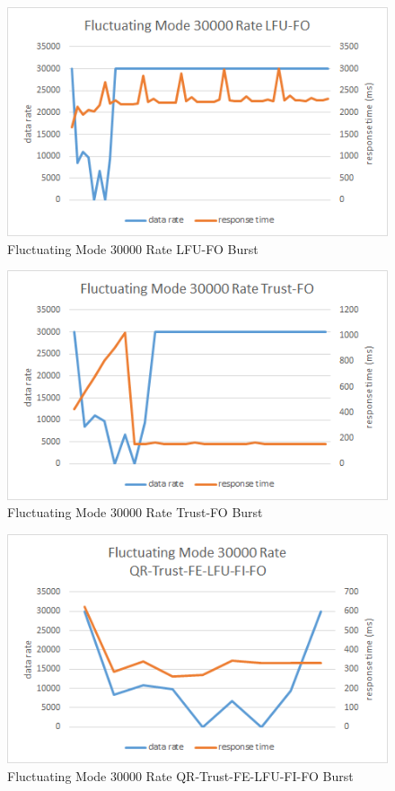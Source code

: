 \begin{figure}[!htbp]
	\centering
	\includegraphics[width=\textwidth]{img/app3-f-30000-lfufo.png}
	\caption{Fluctuating Mode 30000 Rate LFU-FO Burst}
\end{figure}
\begin{figure}[!htbp]
	\centering
	\includegraphics[width=\textwidth]{img/app3-f-30000-trustfo.png}
	\caption{Fluctuating Mode 30000 Rate Trust-FO Burst}
\end{figure}
\begin{figure}[!htbp]
	\centering
	\includegraphics[width=\textwidth]{img/app3-f-30000-qrtrustfelfufifo.png}
	\caption{Fluctuating Mode 30000 Rate QR-Trust-FE-LFU-FI-FO Burst}
\end{figure}
